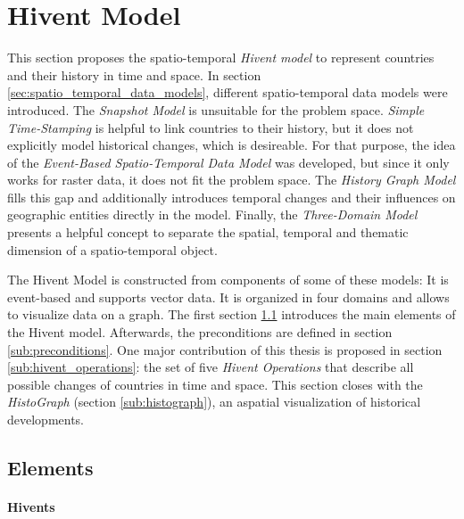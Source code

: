 
\section{Hivent Model} %
\label{sec:hivent_model}

This section proposes the spatio-temporal \emph{Hivent model} to represent countries and their history in time and space. In section \ref{sec:spatio_temporal_data_models}, different spatio-temporal data models were introduced. The \emph{Snapshot Model} is unsuitable for the problem space. \emph{Simple Time-Stamping} is helpful to link countries to their history, but it does not explicitly model historical changes, which is desireable. For that purpose, the idea of the \emph{Event-Based Spatio-Temporal Data Model} was developed, but since it only works for raster data, it does not fit the problem space. The \emph{History Graph Model} fills this gap and additionally introduces temporal changes and their influences on geographic entities directly in the model. Finally, the \emph{Three-Domain Model} presents a helpful concept to separate the spatial, temporal and thematic dimension of a spatio-temporal object.

The Hivent Model is constructed from components of some of these models: It is event-based and supports vector data. It is organized in four domains and allows to visualize data on a graph. The first section \ref{sub:elements} introduces the main elements of the Hivent model. Afterwards, the preconditions are defined in section \ref{sub:preconditions}. One major contribution of this thesis is proposed in section \ref{sub:hivent_operations}: the set of five \emph{Hivent Operations} that describe all possible changes of countries in time and space. This section closes with the \emph{HistoGraph} (section \ref{sub:histograph}), an aspatial visualization of historical developments.

\subsection{Elements} %
\label{sub:elements}

\paragraph{Hivents} %
\label{par:hivent}

